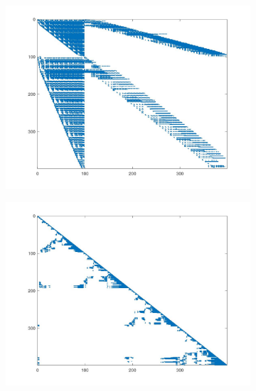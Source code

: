 \begin{figure}[h!]
	\begin{subfigure}[h]{.48\textwidth}
		\centering
		\includegraphics[width=\textwidth]{data/LLU}
		\label{fig:LLU}
	\end{subfigure}
	\begin{subfigure}[h]{.48\textwidth}
		\centering
		\includegraphics[width=\textwidth]{data/LLUPQ}
		\label{fig:LLUPQ}
	\end{subfigure}
	\begin{subfigure}[h]{.48\textwidth}
		\centering

\end{subfigure}
\end{figure}
